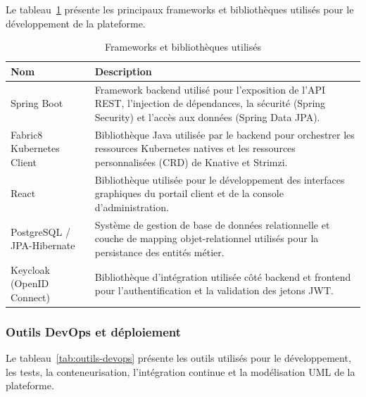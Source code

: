     Le tableau~\ref{tab:frameworks} présente les principaux frameworks et bibliothèques utilisés pour le développement de la plateforme.

    \begin{table}[H]
    \begin{center}
    \begin{tabular}{|l{3.2cm}|p{10cm}|}
    \hline
    \textbf{Nom} & \textbf{Description} \\
    \hline
    Spring Boot & Framework backend utilisé pour l'exposition de l'API REST, l'injection de dépendances, la sécurité (Spring Security) et l'accès aux données (Spring Data JPA). \\
    \hline
    Fabric8 Kubernetes Client & Bibliothèque Java utilisée par le backend pour orchestrer les ressources Kubernetes natives et les ressources personnalisées (CRD) de Knative et Strimzi. \\
    \hline
    React & Bibliothèque utilisée pour le développement des interfaces graphiques du portail client et de la console d'administration. \\
    \hline
    PostgreSQL / JPA-Hibernate & Système de gestion de base de données relationnelle et couche de mapping objet-relationnel utilisés pour la persistance des entités métier. \\
    \hline
    Keycloak (OpenID Connect) & Bibliothèque d'intégration utilisée côté backend et frontend pour l'authentification et la validation des jetons JWT. \\
    \hline
    \end{tabular}
    \caption{Frameworks et bibliothèques utilisés}
    \label{tab:frameworks}
    \end{center}
    \end{table}

    \subsubsection{Outils DevOps et déploiement}

    Le tableau~\ref{tab:outils-devops} présente les outils utilisés pour le développement, les tests, la conteneurisation, l'intégration continue et la modélisation UML de la plateforme.

